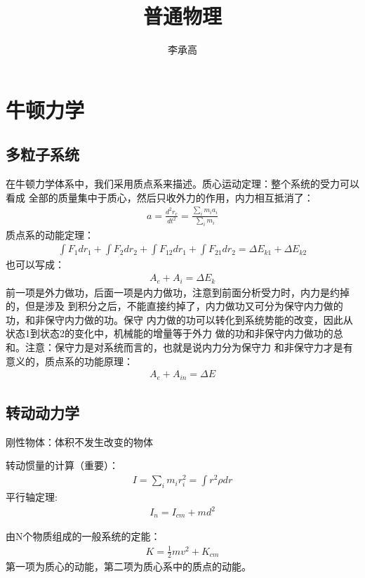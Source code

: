 \documentclass[UTF8]{article}
\title{普通物理}
\author{李承高}
\numberwithin{equation}{section}
\begin{document}
\maketitle
\thispagestyle{empty}
\newpage
\thispagestyle{empty}
\tableofcontents
\newpage


\section{牛顿力学}
\subsection{多粒子系统}
在牛顿力学体系中，我们采用质点系来描述。质心运动定理：整个系统的受力可以看成
全部的质量集中于质心，然后只收外力的作用，内力相互抵消了：
\begin{align*}
    a=\frac{d^2r_c}{dt^2}=\frac{\sum_i m_i a_i}{\sum_i m_i}
\end{align*}
质点系的动能定理：
\begin{align*}
    \int F_1 dr_1+\int F_2 dr_2+\int F_{12}dr_1+\int F_{21}dr_2=\Delta E_{k1}+\Delta E_{k2}
\end{align*}
也可以写成：
\begin{align*}
    A_e+A_i=\Delta E_k
\end{align*}
前一项是外力做功，后面一项是内力做功，注意到前面分析受力时，内力是约掉的，但是涉及
到积分之后，不能直接约掉了，内力做功又可分为保守内力做的功，和非保守内力做的功。保守
内力做的功可以转化到系统势能的改变，因此从状态1到状态2的变化中，机械能的增量等于外力
做的功和非保守内力做功的总和。注意：保守力是对系统而言的，也就是说内力分为保守力
和非保守力才是有意义的，质点系的功能原理：
\begin{align*}
    A_e+A_{in}=\Delta E
\end{align*}
\subsection{转动动力学}
刚性物体：体积不发生改变的物体

转动惯量的计算（重要）：
\begin{align*}
    I=\sum_i m_ir_i^2=\int r^2\rho dr
\end{align*}
平行轴定理:
\begin{align*}
    I_n=I_{cm}+md^2
\end{align*}

由N个物质组成的一般系统的定能：
\begin{align*}
    K=\frac{1}{2}mv^2+K_{cm}
\end{align*}
第一项为质心的动能，第二项为质心系中的质点的动能。
\end{document}
